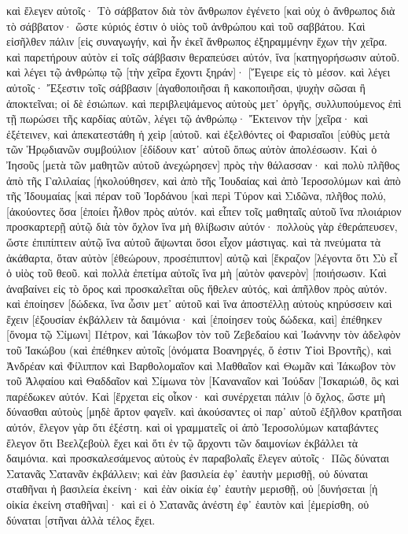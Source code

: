 καὶ ἔλεγεν αὐτοῖς· Τὸ σάββατον διὰ τὸν ἄνθρωπον ἐγένετο [καὶ οὐχ ὁ ἄνθρωπος διὰ τὸ σάββατον· 
ὥστε κύριός ἐστιν ὁ υἱὸς τοῦ ἀνθρώπου καὶ τοῦ σαββάτου. 
Καὶ εἰσῆλθεν πάλιν [εἰς συναγωγήν, καὶ ἦν ἐκεῖ ἄνθρωπος ἐξηραμμένην ἔχων τὴν χεῖρα. 
καὶ παρετήρουν αὐτὸν εἰ τοῖς σάββασιν θεραπεύσει αὐτόν, ἵνα [κατηγορήσωσιν αὐτοῦ. 
καὶ λέγει τῷ ἀνθρώπῳ τῷ [τὴν χεῖρα ἔχοντι ξηράν]· [Ἔγειρε εἰς τὸ μέσον. 
καὶ λέγει αὐτοῖς· Ἔξεστιν τοῖς σάββασιν [ἀγαθοποιῆσαι ἢ κακοποιῆσαι, ψυχὴν σῶσαι ἢ ἀποκτεῖναι; οἱ δὲ ἐσιώπων. 
καὶ περιβλεψάμενος αὐτοὺς μετ᾽ ὀργῆς, συλλυπούμενος ἐπὶ τῇ πωρώσει τῆς καρδίας αὐτῶν, λέγει τῷ ἀνθρώπῳ· Ἔκτεινον τὴν [χεῖρα· καὶ ἐξέτεινεν, καὶ ἀπεκατεστάθη ἡ χεὶρ [αὐτοῦ. 
καὶ ἐξελθόντες οἱ Φαρισαῖοι [εὐθὺς μετὰ τῶν Ἡρῳδιανῶν συμβούλιον [ἐδίδουν κατ᾽ αὐτοῦ ὅπως αὐτὸν ἀπολέσωσιν. 
Καὶ ὁ Ἰησοῦς [μετὰ τῶν μαθητῶν αὐτοῦ ἀνεχώρησεν] πρὸς τὴν θάλασσαν· καὶ πολὺ πλῆθος ἀπὸ τῆς Γαλιλαίας [ἠκολούθησεν, καὶ ἀπὸ τῆς Ἰουδαίας 
καὶ ἀπὸ Ἱεροσολύμων καὶ ἀπὸ τῆς Ἰδουμαίας [καὶ πέραν τοῦ Ἰορδάνου [καὶ περὶ Τύρον καὶ Σιδῶνα, πλῆθος πολύ, [ἀκούοντες ὅσα [ἐποίει ἦλθον πρὸς αὐτόν. 
καὶ εἶπεν τοῖς μαθηταῖς αὐτοῦ ἵνα πλοιάριον προσκαρτερῇ αὐτῷ διὰ τὸν ὄχλον ἵνα μὴ θλίβωσιν αὐτόν· 
πολλοὺς γὰρ ἐθεράπευσεν, ὥστε ἐπιπίπτειν αὐτῷ ἵνα αὐτοῦ ἅψωνται ὅσοι εἶχον μάστιγας. 
καὶ τὰ πνεύματα τὰ ἀκάθαρτα, ὅταν αὐτὸν [ἐθεώρουν, προσέπιπτον] αὐτῷ καὶ [ἔκραζον [λέγοντα ὅτι Σὺ εἶ ὁ υἱὸς τοῦ θεοῦ. 
καὶ πολλὰ ἐπετίμα αὐτοῖς ἵνα μὴ [αὐτὸν φανερὸν] [ποιήσωσιν. 
Καὶ ἀναβαίνει εἰς τὸ ὄρος καὶ προσκαλεῖται οὓς ἤθελεν αὐτός, καὶ ἀπῆλθον πρὸς αὐτόν. 
καὶ ἐποίησεν [δώδεκα, ἵνα ὦσιν μετ᾽ αὐτοῦ καὶ ἵνα ἀποστέλλῃ αὐτοὺς κηρύσσειν 
καὶ ἔχειν [ἐξουσίαν ἐκβάλλειν τὰ δαιμόνια· 
καὶ [ἐποίησεν τοὺς δώδεκα, καὶ] ἐπέθηκεν [ὄνομα τῷ Σίμωνι] Πέτρον, 
καὶ Ἰάκωβον τὸν τοῦ Ζεβεδαίου καὶ Ἰωάννην τὸν ἀδελφὸν τοῦ Ἰακώβου (καὶ ἐπέθηκεν αὐτοῖς [ὀνόματα Βοανηργές, ὅ ἐστιν Υἱοὶ Βροντῆς), 
καὶ Ἀνδρέαν καὶ Φίλιππον καὶ Βαρθολομαῖον καὶ Μαθθαῖον καὶ Θωμᾶν καὶ Ἰάκωβον τὸν τοῦ Ἁλφαίου καὶ Θαδδαῖον καὶ Σίμωνα τὸν [Καναναῖον 
καὶ Ἰούδαν [Ἰσκαριώθ, ὃς καὶ παρέδωκεν αὐτόν. 
Καὶ [ἔρχεται εἰς οἶκον· καὶ συνέρχεται πάλιν [ὁ ὄχλος, ὥστε μὴ δύνασθαι αὐτοὺς [μηδὲ ἄρτον φαγεῖν. 
καὶ ἀκούσαντες οἱ παρ᾽ αὐτοῦ ἐξῆλθον κρατῆσαι αὐτόν, ἔλεγον γὰρ ὅτι ἐξέστη. 
καὶ οἱ γραμματεῖς οἱ ἀπὸ Ἱεροσολύμων καταβάντες ἔλεγον ὅτι Βεελζεβοὺλ ἔχει καὶ ὅτι ἐν τῷ ἄρχοντι τῶν δαιμονίων ἐκβάλλει τὰ δαιμόνια. 
καὶ προσκαλεσάμενος αὐτοὺς ἐν παραβολαῖς ἔλεγεν αὐτοῖς· Πῶς δύναται Σατανᾶς Σατανᾶν ἐκβάλλειν; 
καὶ ἐὰν βασιλεία ἐφ᾽ ἑαυτὴν μερισθῇ, οὐ δύναται σταθῆναι ἡ βασιλεία ἐκείνη· 
καὶ ἐὰν οἰκία ἐφ᾽ ἑαυτὴν μερισθῇ, οὐ [δυνήσεται [ἡ οἰκία ἐκείνη σταθῆναι]· 
καὶ εἰ ὁ Σατανᾶς ἀνέστη ἐφ᾽ ἑαυτὸν καὶ [ἐμερίσθη, οὐ δύναται [στῆναι ἀλλὰ τέλος ἔχει. 
